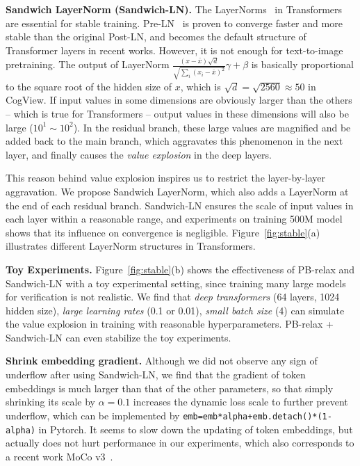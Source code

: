 \textbf{Sandwich LayerNorm (Sandwich-LN). }The LayerNorms~\cite{ba2016layer} in Transformers are essential for stable training. Pre-LN~\cite{xiong2020layer} is proven to converge faster and more stable than the original Post-LN, and becomes the default structure of Transformer layers in recent works. However, it is not enough for text-to-image pretraining. The output of LayerNorm $\frac{(x - \bar x)\sqrt{d}}{\sqrt{\sum_i (x_i - \bar x)^2}}\gamma + \beta$ is basically proportional to the square root of the hidden size of $x$, which is $\sqrt{d} = \sqrt{2560} \approx 50$ in CogView. If input values in some dimensions are obviously larger than the others -- which is true for Transformers -- output values in these dimensions will also be large ($10^1\sim 10^2$). In the residual branch, these large values are magnified and be added back to the main branch, which aggravates this phenomenon in the next layer, and finally causes the \emph{value explosion} in the deep layers. 

This reason behind value explosion inspires us to restrict the layer-by-layer aggravation. We propose Sandwich LayerNorm, which also adds a LayerNorm at the end of each residual branch. Sandwich-LN ensures the scale of input values in each layer within a reasonable range, and experiments on training 500M model shows that its influence on convergence is negligible. Figure~\ref{fig:stable}(a) illustrates different LayerNorm structures in Transformers. 

\textbf{Toy Experiments.} Figure~\ref{fig:stable}(b) shows the effectiveness of PB-relax and Sandwich-LN with a toy experimental setting, since training many large models for verification is not realistic. We find that \emph{deep transformers} (64 layers, 1024 hidden size), \emph{large learning rates} (0.1 or 0.01), \emph{small batch size} (4) can simulate the value explosion in training with reasonable hyperparameters. PB-relax + Sandwich-LN can even stabilize the toy experiments.

\textbf{Shrink embedding gradient.} Although we did not observe any sign of underflow after using Sandwich-LN, we find that the gradient of token embeddings is much larger than that of the other parameters, so that simply shrinking its scale by $\alpha=0.1$ increases the dynamic loss scale to further prevent underflow, which can be implemented by \texttt{emb=emb*alpha+emb.detach()*(1-alpha)} in Pytorch. It seems to slow down the updating of token embeddings, but actually does not hurt performance in our experiments, which also corresponds to a recent work MoCo v3~\cite{chen2021empirical}. 


